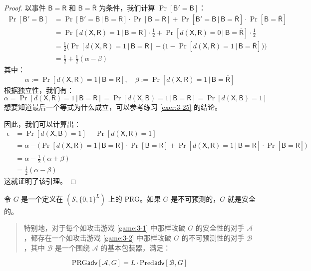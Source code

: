 \begin{proof}
以事件 $\mathsf{B}=\mathsf{R}$ 和 $\mathsf{B}=\mathsf{\overline R}$ 为条件，我们计算 $\Pr[\mathsf{B}'=\mathsf{B}]$：
\[
\begin{aligned}
\Pr[\mathsf{B}'=\mathsf{B}]
&=\Pr[\mathsf{B}'=\mathsf{B}\,|\,\mathsf{B}=\mathsf{R}]\cdot\Pr[\mathsf{B}=\mathsf{R}]+\Pr[\mathsf{B}'=\mathsf{B}\,|\,\mathsf{B}=\mathsf{\overline R}]\cdot\Pr[\mathsf{B}=\mathsf{\overline R}]\\
&=\Pr[d(\mathsf{X},\mathsf{R})=1\,|\,\mathsf{B}=\mathsf{R}]\cdot\frac{1}{2}+\Pr[d(\mathsf{X},\mathsf{R})=0\,|\,\mathsf{B}=\mathsf{\overline R}]\cdot\frac{1}{2}\\
&=\frac{1}{2}
\Big(\Pr[d(\mathsf{X},\mathsf{R})=1\,|\,\mathsf{B}=\mathsf{R}]+
\big(
1-\Pr[d(\mathsf{X},\mathsf{R})=1\,|\,\mathsf{B}=\mathsf{\overline R}]
\big)
\Big)\\
&=\frac{1}{2}+\frac{1}{2}(\alpha-\beta)
\end{aligned}
\]
其中：
\[
\alpha:=\Pr[d(\mathsf{X},\mathsf{R})=1\,|\,\mathsf{B}=\mathsf{R}],
\quad
\beta:=\Pr[d(\mathsf{X},\mathsf{R})=1\,|\,\mathsf{B}=\mathsf{\overline R}]
\]
根据独立性，我们有：
\[
\alpha=\Pr[d(\mathsf{X},\mathsf{R})=1\,|\,\mathsf{B}=\mathsf{R}]=\Pr[d(\mathsf{X},\mathsf{B})=1\,|\,\mathsf{B}=\mathsf{R}]=\Pr[d(\mathsf{X},\mathsf{B})=1]
\]
想要知道最后一个等式为什么成立，可以参考练习 \ref{exer:3-25} 的结论。

因此，我们可以计算出：
\[
\begin{aligned}
\epsilon
&=\Pr[d(\mathsf{X},\mathsf{B})=1]-\Pr[d(\mathsf{X},\mathsf{R})=1]\\
&=\alpha-
\Big(\Pr[d(\mathsf{X},\mathsf{R})=1\,|\,\mathsf{B}=\mathsf{R}]\cdot\Pr[\mathsf{B}=\mathsf{R}]+\Pr[d(\mathsf{X},\mathsf{R})=1\,|\,\mathsf{B}=\mathsf{\overline R}]\cdot\Pr[\mathsf{B}=\mathsf{\overline R}]
\Big)\\
&=\alpha-\frac{1}{2}(\alpha+\beta)\\
&=\frac{1}{2}(\alpha-\beta)
\end{aligned}
\]
这就证明了该引理。
\end{proof}

\begin{theorem}
令 $G$ 是一个定义在 $(\mathcal{S},\{0,1\}^L)$ 上的 PRG。如果 $G$ 是不可预测的，$G$ 就是安全的。
\begin{quote}
特别地，对于每个如攻击游戏 \ref{game:3-1} 中那样攻破 $G$ 的安全性的对手 $\mathcal{A}$，都存在一个如攻击游戏 \ref{game:3-2} 中那样攻破 $G$ 的不可预测性的对手 $\mathcal{B}$，其中 $\mathcal{B}$ 是一个围绕 $\mathcal{A}$ 的基本包装器，满足：
\end{quote}
\[
\mathrm{PRG}\mathsf{adv}[\mathcal{A},G]
=L\cdot
\mathrm{Pred}\mathsf{adv}[\mathcal{B},G]
\]
\end{theorem}

